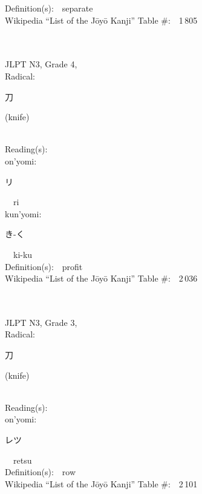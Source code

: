 \begin{multicols}{2}
Definition(s):\ \ separate \\
Wikipedia ``List of the J\=oy\=o Kanji'' Table \#:\ \ 1\,805 \\
\ \ \\
{\fontsize{34pt}{40pt}  }\ \ \\  %
{JLPT N3, Grade 4, \\Radical:\ \ {\begin{CJK}{UTF8}{min} 刀 \end{CJK}} (knife) } \\
Reading(s):\ \ \\
{\hspace*{1em}}on'yomi:\ \ \\
{\hspace*{2em}}{\begin{CJK}{UTF8}{min} リ \end{CJK}}\ \ ri\ \ \\
{\hspace*{1em}}kun'yomi:\ \ \\
{\hspace*{2em}}{\begin{CJK}{UTF8}{min} き-く \end{CJK}}\ \ ki-ku\ \ \\
Definition(s):\ \ profit \\
Wikipedia ``List of the J\=oy\=o Kanji'' Table \#:\ \ 2\,036 \\
\ \ \\
{\fontsize{34pt}{40pt}  }\ \ \\  %
{JLPT N3, Grade 3, \\Radical:\ \ {\begin{CJK}{UTF8}{min} 刀 \end{CJK}} (knife) } \\
Reading(s):\ \ \\
{\hspace*{1em}}on'yomi:\ \ \\
{\hspace*{2em}}{\begin{CJK}{UTF8}{min} レツ \end{CJK}}\ \ retsu\ \ \\
Definition(s):\ \ row \\
Wikipedia ``List of the J\=oy\=o Kanji'' Table \#:\ \ 2\,101 \\
\ \ \\
\end{multicols}


